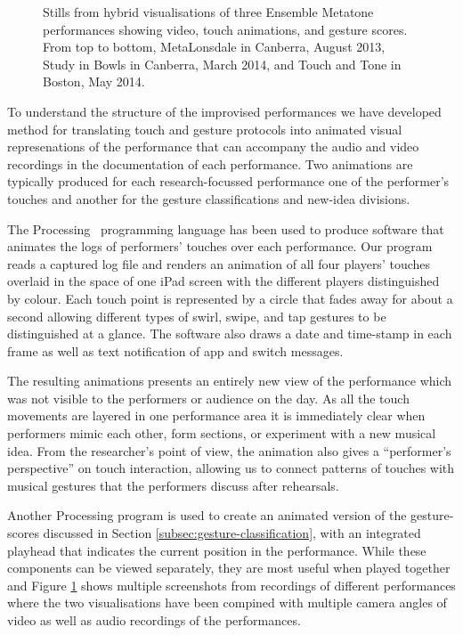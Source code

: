 \documentclass[graybox]{svmult}
\begin{document}
\begin{figure}
  \caption{Stills from hybrid visualisations of three Ensemble Metatone
    performances showing video, touch animations, and gesture scores.
    From top to bottom, MetaLonsdale in Canberra, August 2013, Study
    in Bowls in Canberra, March 2014, and Touch and Tone in Boston,
    May 2014.}
  \label{fig:metatone-visualisations}
\end{figure}


To understand the structure of the improvised performances we have
developed method for translating touch and gesture protocols into
animated visual represenations of the performance that can accompany
the audio and video recordings in the documentation of each
performance. Two animations are typically produced for each research-focussed
performance one of the performer's touches and another for the
gesture classifications and new-idea divisions. 

The Processing~\cite{Reas:2006kq} programming language has been used
to produce software that animates the logs of performers' touches over
each performance. Our program reads a captured log file and renders an
animation of all four players' touches overlaid in the space of one
iPad screen with the different players distinguished by colour. Each
touch point is represented by a circle that fades away for about a
second allowing different types of swirl, swipe, and tap gestures to
be distinguished at a glance. The software also draws a date and
time-stamp in each frame as well as text notification of app and
switch messages.

The resulting animations presents an entirely new view of the
performance which was not visible to the performers or audience on the
day. As all the touch movements are layered in one performance area it
is immediately clear when performers mimic each other, form sections,
or experiment with a new musical idea. From the researcher's point of
view, the animation also gives a ``performer's perspective'' on touch
interaction, allowing us to connect patterns of touches with musical
gestures that the performers discuss after rehearsals.

Another Processing program is used to create an animated version of
the gesture-scores discussed in Section
\ref{subsec:gesture-classification}, with an integrated playhead that
indicates the current position in the performance. While these
components can be viewed separately, they are most useful when played
together and Figure \ref{fig:metatone-visualisations} shows multiple
screenshots from recordings of different performances where the two
visualisations have been compined with multiple camera angles of video
as well as audio recordings of the performances.
\end{document}
